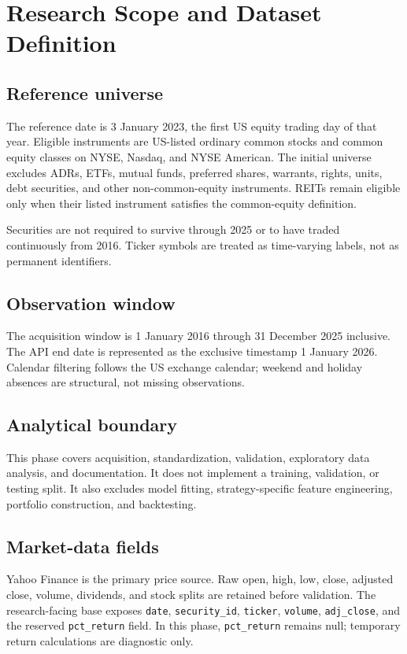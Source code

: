 \section{Research Scope and Dataset Definition}

\subsection{Reference universe}

The reference date is 3 January 2023, the first US equity trading day of that
year. Eligible instruments are US-listed ordinary common stocks and common
equity classes on NYSE, Nasdaq, and NYSE American. The initial universe excludes
ADRs, ETFs, mutual funds, preferred shares, warrants, rights, units, debt
securities, and other non-common-equity instruments. REITs remain eligible only
when their listed instrument satisfies the common-equity definition.

Securities are not required to survive through 2025 or to have traded
continuously from 2016. Ticker symbols are treated as time-varying labels, not
as permanent identifiers.

\subsection{Observation window}

The acquisition window is 1 January 2016 through 31 December 2025 inclusive.
The API end date is represented as the exclusive timestamp 1 January 2026.
Calendar filtering follows the US exchange calendar; weekend and holiday
absences are structural, not missing observations.

\subsection{Analytical boundary}

This phase covers acquisition, standardization, validation, exploratory data
analysis, and documentation. It does not implement a training, validation, or
testing split. It also excludes model fitting, strategy-specific feature
engineering, portfolio construction, and backtesting.

\subsection{Market-data fields}

Yahoo Finance is the primary price source. Raw open, high, low, close, adjusted
close, volume, dividends, and stock splits are retained before validation.
The research-facing base exposes \texttt{date}, \texttt{security\_id},
\texttt{ticker}, \texttt{volume}, \texttt{adj\_close}, and the reserved
\texttt{pct\_return} field. In this phase, \texttt{pct\_return} remains null;
temporary return calculations are diagnostic only.
